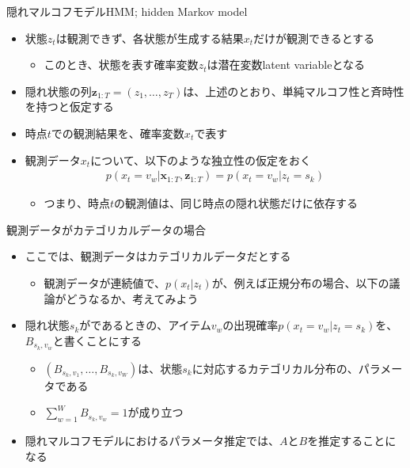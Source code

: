 \documentclass[aspectratio=169,unicode,dvipdfmx,14pt]{beamer}
\begin{document}
\begin{frame}{隠れマルコフモデルHMM; hidden Markov model}
\begin{itemize}
\item 状態$z_t$は観測できず、各状態が生成する結果$x_t$だけが観測できるとする
\begin{itemize}
\item このとき、状態を表す確率変数$z_t$は潜在変数latent variableとなる
\end{itemize}
\item 隠れ状態の列$\bm{z}_{1:T}=(z_1,\ldots,z_T)$は、上述のとおり、単純マルコフ性と斉時性を持つと仮定する
\item 時点$t$での観測結果を、確率変数$x_t$で表す
\item 観測データ$x_t$について、以下のような独立性の仮定をおく
\begin{align}
p(x_t=v_w| \bm{x}_{1:T},\bm{z}_{1:T}) = p(x_t=v_w|z_t=s_k)
\end{align}
\vspace{-.2in}
\begin{itemize}
\item つまり、時点$t$の観測値は、同じ時点の隠れ状態だけに依存する
\end{itemize}
\end{itemize}
\end{frame}

\begin{frame}{観測データがカテゴリカルデータの場合}
\begin{itemize}
\item ここでは、観測データはカテゴリカルデータだとする
\begin{itemize}
\item 観測データが連続値で、$p(x_t|z_t)$が、例えば正規分布の場合、以下の議論がどうなるか、考えてみよう
\end{itemize}
\item 隠れ状態$s_k$がであるときの、アイテム$v_w$の出現確率$p(x_t=v_w|z_t=s_k)$を、$B_{s_k,v_w}$と書くことにする
\begin{itemize}
\item $(B_{s_k,v_1}, \ldots, B_{s_k,v_W})$は、状態$s_k$に対応するカテゴリカル分布の、パラメータである
\item $\sum_{w=1}^W B_{s_k,v_w} = 1$が成り立つ
\end{itemize}
\item 隠れマルコフモデルにおけるパラメータ推定では、$A$と$B$を推定することになる
\end{itemize}
\end{frame}
\end{document}

